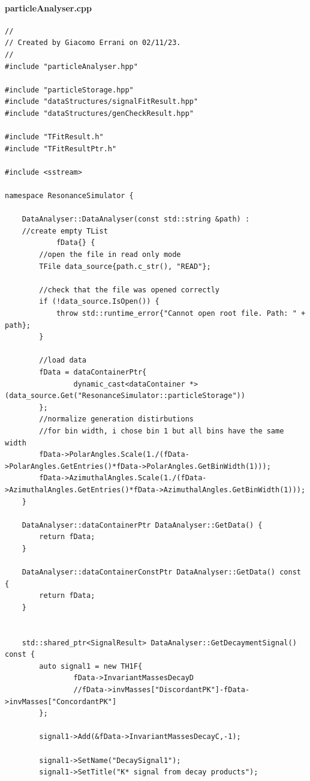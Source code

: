 \documentclass[12pt, a4paper]{article}
\begin{document}
\paragraph{particleAnalyser.cpp}


\begin{verbatim}
//
// Created by Giacomo Errani on 02/11/23.
//
#include "particleAnalyser.hpp"

#include "particleStorage.hpp"
#include "dataStructures/signalFitResult.hpp"
#include "dataStructures/genCheckResult.hpp"

#include "TFitResult.h"
#include "TFitResultPtr.h"

#include <sstream>

namespace ResonanceSimulator {

    DataAnalyser::DataAnalyser(const std::string &path) :
    //create empty TList
            fData{} {
        //open the file in read only mode
        TFile data_source{path.c_str(), "READ"};

        //check that the file was opened correctly
        if (!data_source.IsOpen()) {
            throw std::runtime_error{"Cannot open root file. Path: " + path};
        }

        //load data
        fData = dataContainerPtr{
                dynamic_cast<dataContainer *>(data_source.Get("ResonanceSimulator::particleStorage"))
        };
        //normalize generation distirbutions
        //for bin width, i chose bin 1 but all bins have the same width
        fData->PolarAngles.Scale(1./(fData->PolarAngles.GetEntries()*fData->PolarAngles.GetBinWidth(1)));
        fData->AzimuthalAngles.Scale(1./(fData->AzimuthalAngles.GetEntries()*fData->AzimuthalAngles.GetBinWidth(1)));
    }

    DataAnalyser::dataContainerPtr DataAnalyser::GetData() {
        return fData;
    }

    DataAnalyser::dataContainerConstPtr DataAnalyser::GetData() const {
        return fData;
    }


    std::shared_ptr<SignalResult> DataAnalyser::GetDecaymentSignal() const {
        auto signal1 = new TH1F{
                fData->InvariantMassesDecayD
                //fData->invMasses["DiscordantPK"]-fData->invMasses["ConcordantPK"]
        };

        signal1->Add(&fData->InvariantMassesDecayC,-1);

        signal1->SetName("DecaySignal1");
        signal1->SetTitle("K* signal from decay products");


\end{verbatim}
\end{document}
